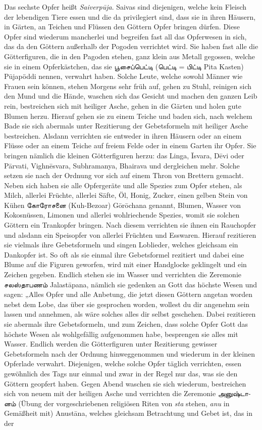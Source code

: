 \documentclass{article}
\newcommand{\TamilText}[1]{\texttamil{#1}}
\newcommand{\tam}[1]{\TamilText{#1}}
\begin{document}
Das sechste Opfer heißt \emph{Saiverp\={u}ja}. Saivas sind diejenigen, welche kein Fleisch der lebendigen Tiere essen und die da privilegiert sind, dass sie in ihren Häusern, in Gärten, an Teichen und Flüssen den Göttern Opfer bringen dürfen. Diese Opfer sind wiederum mancherlei und begreifen fast all das Opferwesen in sich, das da den Göttern außerhalb der Pogoden verrichtet wird. Sie haben fast alle die Götterfiguren, die in den Pagoden stehen, ganz klein aus Metall gegossen, welche sie in einem Opferkästchen, das sie \tam{பூசைப்பெட்டி} (\tam{பெட்டி} = \tam{பிட்டி} Pita Kasten) P\={u}japöddi nennen, verwahrt haben. Solche Leute, welche sowohl Männer wie Frauen sein können, stehen Morgens sehr früh auf, gehen zu Stuhl, reinigen sich den Mund und die Hände, waschen sich das Gesicht und machen den ganzen Leib rein, bestreichen sich mit heiliger Asche, gehen in die Gärten und holen gute Blumen herzu. Hierauf gehen sie zu einem Teiche und baden sich, nach welchem Bade sie sich abermals unter Rezitierung der Gebetsformeln mit heiliger Asche bestreichen. Alsdann verrichten sie entweder in ihren Häusern oder an einem Flüsse oder an einem Teiche auf freiem Felde oder in einem Garten ihr Opfer. Sie bringen nämlich die kleinen Götterfiguren herzu: das Linga, \={I}svara, D\={e}vi oder P\={a}rvati, Vighn\={e}svara, Subhramanya, Bhairava und dergleichen mehr. Solche setzen sie nach der Ordnung vor sich auf einem Thron von Brettern gemacht. Neben sich haben sie alle Opfergeräte und alle Spezies zum Opfer stehen, als Milch, allerlei Früchte, allerlei Säfte, Öl, Honig, Zucker, einen gelben Stein von Kühen \tam{கோரோசனை} (Kuh-Bezoar) G\={o}r\={o}chana genannt, Blumen, Wasser von Kokosnüssen, Limonen und allerlei wohlriechende Spezies, womit sie solchen Göttern ein Trankopfer bringen. Nach diesem verrichten sie ihnen ein Rauchopfer und alsdann ein Speisopfer von allerlei Früchten und Esswaren. Hierauf rezitieren sie vielmals ihre Gebetsformeln und singen Loblieder, welches gleichsam ein Dankopfer ist. So oft als sie einmal ihre Gebetsformel rezitiert und dabei eine Blume auf die Figuren geworfen, wird mit einer Handglocke geklingelt und ein Zeichen gegeben. Endlich stehen sie im Wasser und verrichten die Zeremonie \tam{சலஸ்தாபணம்} Jalast\={a}pana, nämlich sie gedenken an Gott das höchste Wesen und sagen: „Alles Opfer und alle Anbetung, die jetzt diesen Göttern angetan worden nebst dem Lobe, das über sie gesprochen worden, wollest du dir angenehm sein lassen und annehmen, als wäre solches alles dir selbst geschehen. Dabei rezitieren sie abermals ihre Gebetsformeln, und zum Zeichen, dass solche Opfer Gott das höchste Wesen als wohlgefällig aufgenommen habe, besprengen sie alles mit Wasser. Endlich werden die Götterfiguren unter Rezitierung gewisser Gebetsformeln nach der Ordnung hinweggenommen und wiederum in der kleinen Opferlade verwahrt. Diejenigen, welche solche Opfer täglich verrichten, essen gewöhnlich des Tags nur einmal und zwar in der Regel nur das, was sie den Göttern geopfert haben. Gegen Abend waschen sie sich wiederum, bestreichen sich von neuem mit der heiligen Asche und verrichten die Zeremonie \tam{அனுஷ்டானம்} (Übung der vorgeschriebenen religiösen Riten von \emph{sta} stehen, \emph{anu} in Gemäßheit mit) Anust\={a}na, welches gleichsam Betrachtung und Gebet ist, das in der 
\end{document}
